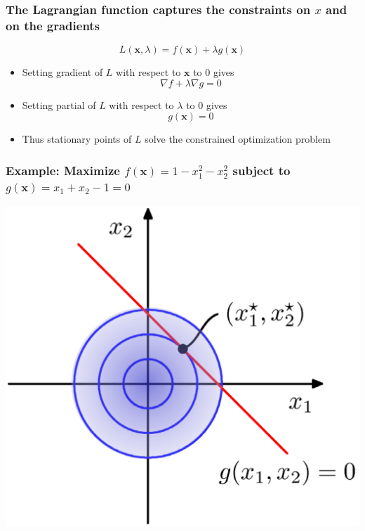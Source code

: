 \documentclass[12pt,notes,mathserif]{beamer}
\begin{document}
\begin{frame}[c]
	\frametitle{The Lagrangian function captures the constraints on $x$ and on the gradients}
	\[
		L(\mathbf{x},\lambda)=f(\mathbf{x})+\lambda g(\mathbf{x})
	\]
	\begin{itemize}
		\item Setting gradient of $L$ with respect to $\mathbf{x}$ to 0 gives
		      \[
			      \nabla f+\lambda \nabla g=0
		      \]
		\item Setting partial of $L$ with respect to $\lambda$ to 0 gives
		      \[
			      g(\mathbf{x})=0
		      \]
		\item Thus stationary points of $L$ solve the constrained optimization problem
	\end{itemize}
\end{frame}



\begin{frame}[c]
	\frametitle{Example: Maximize $f(\mathbf{x})=1-x_1^2-x_2^2$ subject to $g(\mathbf{x})=x_1+x_2-1=0$}
	\begin{center}
		\includegraphics[width=0.65\linewidth]{fig8/lec830.jpg}
	\end{center}
\end{frame}
\end{document}
